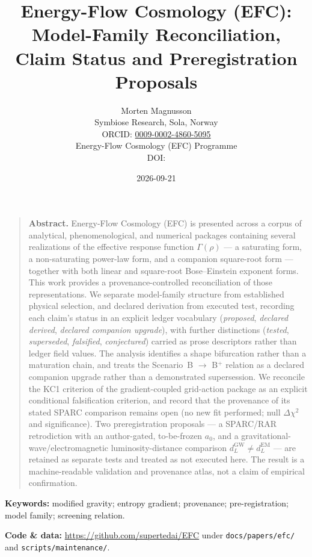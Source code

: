 \documentclass[11pt,a4paper]{article}
\title{\color{efcblue}\bfseries Energy-Flow Cosmology (EFC): Model-Family Reconciliation, Claim Status and Preregistration Proposals}
\author{Morten Magnusson \\[2pt]
        \small Symbiose Research, Sola, Norway \\
        \small ORCID: \href{https://orcid.org/0009-0002-4860-5095}{0009-0002-4860-5095} \\[2pt]
        \small Energy-Flow Cosmology (EFC) Programme \\[1pt]
        \small DOI: \paperdoi}
\date{2026-09-21}
\begin{document}
\maketitle
\thispagestyle{fancy}

\vspace{-2em}

\begin{quote}\small
\textbf{Abstract.}
Energy-Flow Cosmology (EFC) is presented across a corpus of analytical, phenomenological, and numerical packages containing several realizations of the effective response function $\Gamma(\rho)$ --- a saturating form, a non-saturating power-law form, and a companion square-root form --- together with both linear and square-root Bose--Einstein exponent forms. This work provides a provenance-controlled reconciliation of those representations. We separate model-family structure from established physical selection, and declared derivation from executed test, recording each claim's status in an explicit ledger vocabulary (\emph{proposed}, \emph{declared derived}, \emph{declared companion upgrade}), with further distinctions (\emph{tested}, \emph{superseded}, \emph{falsified}, \emph{conjectured}) carried as prose descriptors rather than ledger field values. The analysis identifies a shape bifurcation rather than a maturation chain, and treats the Scenario~B $\to$ B$^{+}$ relation as a declared companion upgrade rather than a demonstrated supersession. We reconcile the KC1 criterion of the gradient-coupled grid-action package as an explicit conditional falsification criterion, and record that the provenance of its stated SPARC comparison remains open (no new fit performed; null $\Delta\chi^{2}$ and significance). Two preregistration proposals --- a SPARC/RAR retrodiction with an author-gated, to-be-frozen $a_{0}$, and a gravitational-wave/electromagnetic luminosity-distance comparison $d_{L}^{\mathrm{GW}} \neq d_{L}^{\mathrm{EM}}$ --- are retained as separate tests and treated as not executed here. The result is a machine-readable validation and provenance atlas, not a claim of empirical confirmation.
\end{quote}

\vspace{0.5em}

\noindent\textbf{Keywords:} modified gravity; entropy gradient; provenance; pre-registration; model family; screening relation.

\vspace{0.5em}

\noindent\textbf{Code \& data:} \url{https://github.com/supertedai/EFC} under \texttt{docs/papers/efc/} and \texttt{scripts/maintenance/}.
\end{document}
